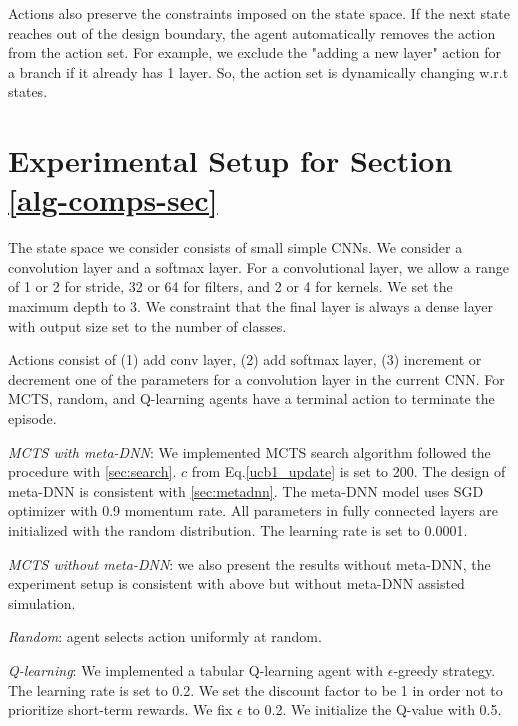 \documentclass[10pt,twocolumn,letterpaper]{article}
\begin{document}
Actions also preserve the constraints imposed on the state space. If the next state reaches out of the design boundary, the agent automatically removes the action
from the action set. For example, we exclude the "adding a new layer" action for a branch if it already has 1 layer. So, the action set is dynamically changing w.r.t states.













\section{Experimental Setup for Section \ref{alg-comps-sec}}
\label{ap:comparison}

The state space we consider consists of small simple CNNs.
We consider a convolution layer and a softmax layer.
For a convolutional layer, we allow a range of 1 or 2 for stride, 32 or 64 for filters, and 2 or 4 for kernels.
We set the maximum depth to 3.
We constraint that the final layer is always a dense layer with output size set to the number of classes.

Actions consist of (1) add conv layer, (2) add softmax layer, (3) increment or decrement one of the parameters for a convolution layer in the current CNN.
For MCTS, random, and Q-learning agents have a terminal action to terminate the episode.

\textit{MCTS with meta-DNN}: We implemented MCTS search algorithm followed the procedure with \ref{sec:search}. $c$ from Eq.\ref{ucb1_update} is set to 200. The design of meta-DNN is consistent with \ref{sec:metadnn}. The meta-DNN model uses SGD optimizer with 0.9 momentum rate. All parameters in fully connected layers are initialized with the random distribution. The learning rate is set to 0.0001.

\textit{MCTS without meta-DNN}: we also present the results without meta-DNN, the experiment setup is consistent with above but without meta-DNN assisted simulation.

\textit{Random}: agent selects action uniformly at random.

\textit{Q-learning}: We implemented a tabular Q-learning agent with $\epsilon$-greedy strategy.
The learning rate is set to 0.2. We set the discount factor to be 1 in order not to prioritize short-term rewards. We fix $\epsilon$ to 0.2.
We initialize the Q-value with 0.5.
\end{document}
